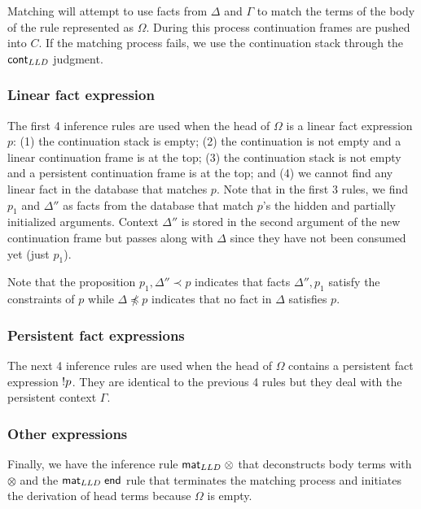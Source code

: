 Matching will attempt to use facts from $\Delta$ and $\Gamma$ to match the terms
of the body of the rule represented as $\Omega$. During this process
continuation frames are pushed into $C$.  If the matching process fails, we use
the continuation stack through the $\mathsf{cont}_{LLD} \;$judgment.

\subsubsection{Linear fact expression}

The first 4 inference rules are used when the head of $\Omega$ is a linear fact
expression $p$: (1) the continuation stack is empty; (2) the continuation is not
empty and a linear continuation frame is at the top; (3) the continuation stack
is not empty and a persistent continuation frame is at the top; and (4) we
cannot find any linear fact in the database that matches $p$. Note that in the
first 3 rules, we find $p_1$ and $\Delta''$ as facts from the database that
match $p$'s the hidden and partially initialized arguments.  Context $\Delta''$
is stored in the second argument of the new continuation frame but passes along
with $\Delta$ since they have not been consumed yet (just $p_1$).

Note that the proposition $p_1, \Delta'' \prec p$ indicates that facts
$\Delta'', p_1$ satisfy the constraints of $p$ while $\Delta \npreceq p$
indicates that no fact in $\Delta$ satisfies $p$.



\subsubsection{Persistent fact expressions}

The next 4 inference rules are used when the head of $\Omega$ contains a
persistent fact expression ${!} p$. They are identical to the previous 4 rules
but they deal with the persistent context $\Gamma$.



\subsubsection{Other expressions}

Finally, we have the inference rule $\mathsf{mat}_{LLD} \; \otimes$ that deconstructs body terms
with $\otimes$ and the $\mathsf{mat}_{LLD} \; \mathsf{end}$ rule that terminates the matching process
and initiates the derivation of head terms because $\Omega$ is empty.

